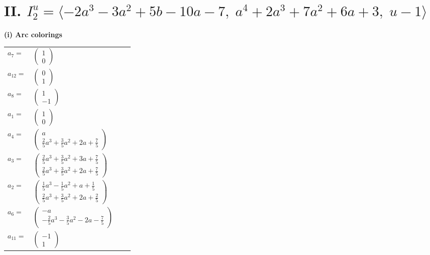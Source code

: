 \documentclass[1p]{elsarticle_modified}
\theoremstyle{definition}
\begin{document}
\centering \section*{II. $I^u_{2}= \langle -2 a^3-3 a^2+5 b-10 a-7,\;a^4+2 a^3+7 a^2+6 a+3,\;u-1 \rangle$}
\flushleft \textbf{(i) Arc colorings}\\
\begin{tabular}{m{7pt} m{180pt} m{7pt} m{180pt} }
\flushright $a_{7}=$&$\begin{pmatrix}1\\0\end{pmatrix}$ \\
\flushright $a_{12}=$&$\begin{pmatrix}0\\1\end{pmatrix}$ \\
\flushright $a_{8}=$&$\begin{pmatrix}1\\-1\end{pmatrix}$ \\
\flushright $a_{1}=$&$\begin{pmatrix}1\\0\end{pmatrix}$ \\
\flushright $a_{4}=$&$\begin{pmatrix}a\\\frac{2}{5} a^3+\frac{3}{5} a^2+2 a+\frac{7}{5}\end{pmatrix}$ \\
\flushright $a_{3}=$&$\begin{pmatrix}\frac{2}{5} a^3+\frac{3}{5} a^2+3 a+\frac{7}{5}\\\frac{2}{5} a^3+\frac{3}{5} a^2+2 a+\frac{7}{5}\end{pmatrix}$ \\
\flushright $a_{2}=$&$\begin{pmatrix}\frac{1}{5} a^3-\frac{1}{5} a^2+a+\frac{1}{5}\\\frac{2}{5} a^3+\frac{3}{5} a^2+2 a+\frac{2}{5}\end{pmatrix}$ \\
\flushright $a_{6}=$&$\begin{pmatrix}- a\\-\frac{2}{5} a^3-\frac{3}{5} a^2-2 a-\frac{7}{5}\end{pmatrix}$ \\
\flushright $a_{11}=$&$\begin{pmatrix}-1\\1\end{pmatrix}$ \\

\end{tabular}
\end{document}
